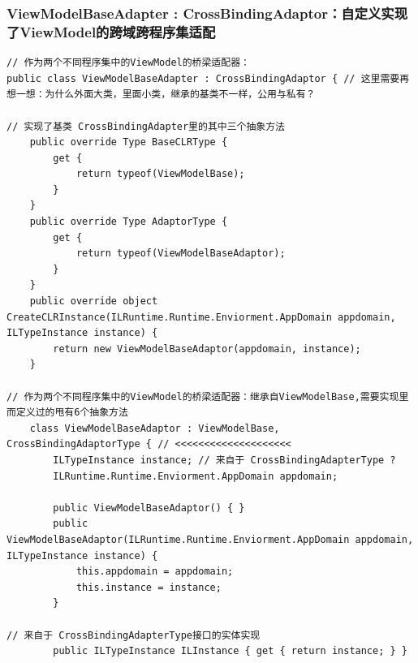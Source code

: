 \documentclass[9pt, b5paper]{article}
\begin{document}
\subsubsection{ViewModelBaseAdapter : CrossBindingAdaptor：自定义实现了ViewModel的跨域跨程序集适配}
\label{sec-6-5-2}
\begin{verbatim}
// 作为两个不同程序集中的ViewModel的桥梁适配器：
public class ViewModelBaseAdapter : CrossBindingAdaptor { // 这里需要再想一想：为什么外面大类，里面小类，继承的基类不一样，公用与私有？

// 实现了基类 CrossBindingAdapter里的其中三个抽象方法
    public override Type BaseCLRType {
        get {
            return typeof(ViewModelBase);
        }
    }
    public override Type AdaptorType {
        get {
            return typeof(ViewModelBaseAdaptor);
        }
    }
    public override object CreateCLRInstance(ILRuntime.Runtime.Enviorment.AppDomain appdomain, ILTypeInstance instance) {
        return new ViewModelBaseAdaptor(appdomain, instance);
    }

// 作为两个不同程序集中的ViewModel的桥梁适配器：继承自ViewModelBase,需要实现里而定义过的甩有6个抽象方法
    class ViewModelBaseAdaptor : ViewModelBase, CrossBindingAdaptorType { // <<<<<<<<<<<<<<<<<<<< 
        ILTypeInstance instance; // 来自于 CrossBindingAdapterType ?
        ILRuntime.Runtime.Enviorment.AppDomain appdomain;

        public ViewModelBaseAdaptor() { }
        public ViewModelBaseAdaptor(ILRuntime.Runtime.Enviorment.AppDomain appdomain, ILTypeInstance instance) {
            this.appdomain = appdomain;
            this.instance = instance;
        }
        
// 来自于 CrossBindingAdapterType接口的实体实现
        public ILTypeInstance ILInstance { get { return instance; } } 
        

\end{verbatim}
\end{document}
